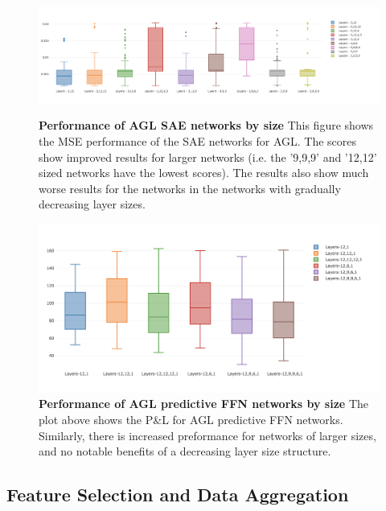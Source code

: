 \documentclass[a4paper,latin]{paper}
\begin{document}
\begin{figure}[H]
	\centering
	\begin{minipage}{0.45\textwidth}
		\centering 
		\includegraphics[scale=0.2]{images/iteration_five/it5_sae_size.png}
		\caption{\textbf{Performance of AGL SAE networks by size} \newline 
			This figure shows the MSE performance of the SAE networks for AGL. The scores show improved results for larger networks (i.e. the '9,9,9' and '12,12' sized networks have the lowest scores). The results also show much worse results for the networks in the networks with gradually decreasing layer sizes.}
		\label{figure-results_sae_size_agl}
	\end{minipage}\hfill
	\begin{minipage}{0.45\textwidth}
		\centering 
		\includegraphics[scale=0.2]{images/iteration_five/it_5_ffn_size.png}
		\caption{\textbf{Performance of AGL predictive FFN networks by size} \newline
			 The plot above shows the P\&L for AGL predictive FFN networks. Similarly, there is increased preformance for networks of larger sizes, and no notable benefits of a decreasing layer size structure.}
		\label{figure-results_ffn_size_agl}
	\end{minipage}
\end{figure}


\subsection{Feature Selection and Data Aggregation}
\end{document}
